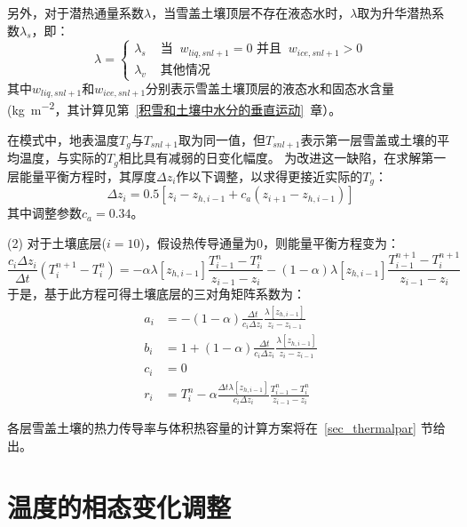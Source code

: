 另外，对于潜热通量系数$\lambda$，当雪盖土壤顶层不存在液态水时，$\lambda$取为升华潜热系数$\lambda_s$，即：
\begin{equation}
\lambda=\left\{\begin{array}{lr}\lambda_{s} & \text { 当 }\ w_{liq, s n l+1}=0 \text { 并且 }\ w_{ice, s n l+1}>0 \\ \lambda_{v} & \text { 其他情况 }\end{array}\right.
\end{equation}
其中$w_{liq,snl+1}$和$w_{ice,snl+1}$分别表示雪盖土壤顶层的液态水和固态水含量 (\unit{kg.m^{-2}}，其计算见第~\ref{积雪和土壤中水分的垂直运动}~章）。

在模式中，地表温度$T_g$与$T_{snl+1}$取为同一值，但$T_{snl+1}$表示第一层雪盖或土壤的平均温度，与实际的$T_g$相比具有减弱的日变化幅度。
为改进这一缺陷，在求解第一层能量平衡方程时，其厚度$\Delta z_i$作以下调整，以求得更接近实际的$T_g$：
\begin{equation}
\Delta z_{i}=0.5\left[z_{i}-z_{h, i-1}+c_{a}\left(z_{i+1}-z_{h, i-1}\right)\right]
\end{equation}
其中调整参数$c_a=0.34$。

(2) 对于土壤底层($i=10$)，假设热传导通量为0，则能量平衡方程变为：
\begin{equation}
\frac{c_{i} \Delta z_{i}}{\Delta t}\left(T_{i}^{n+1}-T_{i}^{n}\right)=-\alpha \lambda\left[z_{h, i-1}\right] \frac{T_{i-1}^{n}-T_{i}^{n}}{z_{i-1}-z_{i}}-(1-\alpha) \lambda\left[z_{h, i-1}\right] \frac{T_{i-1}^{n+1}-T_{i}^{n+1}}{z_{i-1}-z_{i}}
\end{equation}
于是，基于此方程可得土壤底层的三对角矩阵系数为：
\begin{equation}
\begin{aligned}
a_{i} &= -(1-\alpha) \frac{\Delta t}{c_{i} \Delta z_{i}} \frac{\lambda\left[z_{h, i-1}\right]}{z_{i}-z_{i-1}} \\
b_{i} &= 1+(1-\alpha) \frac{\Delta t}{c_{i} \Delta z_{i}} \frac{\lambda\left[z_{h, i-1}\right]}{z_{i}-z_{i-1}} \\
c_{i} &= 0 \\
r_{i} &= T_{i}^{n}-\alpha \frac{\Delta t \lambda\left[z_{h, i-1}\right]}{c_{i} \Delta z_{i}} \frac{T_{i-1}^{n}-T_{i}^{n}}{z_{i-1}-z_{i}}
\end{aligned}
\end{equation}

各层雪盖土壤的热力传导率与体积热容量的计算方案将在~\ref{sec_thermalpar} 节给出。


\section{温度的相态变化调整}\label{sec:温度的相态变化调整}

